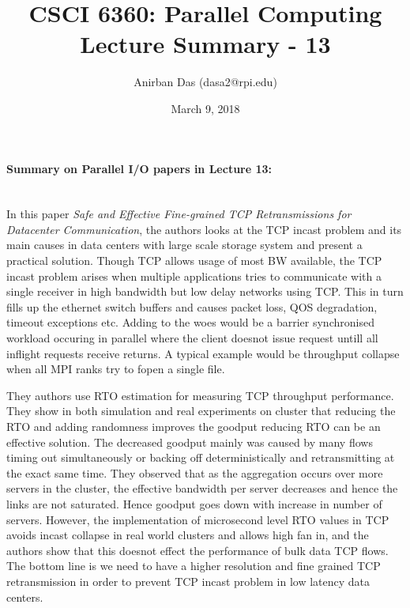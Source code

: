 \documentclass[a4paper,12 pt]{article}
\title{\vspace{-2.0cm}CSCI 6360: Parallel Computing Lecture Summary - 13}
\author{Anirban Das (dasa2@rpi.edu) }
\date{March 9, 2018}
\begin{document}
\maketitle

\paragraph{Summary on Parallel I/O papers in Lecture 13:\\\\}

In this paper \textit{Safe and Effective Fine-grained TCP Retransmissions for Datacenter Communication}, the authors looks at the TCP incast problem and its main causes in data centers with large scale storage system and present a practical solution. Though TCP allows usage of most BW available, the TCP incast problem arises when multiple applications tries to communicate with a single receiver in high bandwidth but low delay networks using TCP. This in turn fills up the ethernet switch buffers and causes packet loss, QOS degradation, timeout exceptions etc. Adding to the woes would be a barrier synchronised workload occuring in parallel where the client doesnot issue request untill all inflight requests receive returns. A typical example would be throughput collapse when all MPI ranks try to fopen a single file.

They authors use RTO estimation for measuring TCP throughput performance. They show in both simulation and real experiments on cluster that reducing the RTO and adding randomness improves the goodput reducing RTO can be an effective solution. The decreased goodput mainly was caused by many flows timing out simultaneously or backing off deterministically and retransmitting at the exact same time. They observed that as the aggregation occurs over more servers in the cluster, the effective bandwidth per server decreases and hence the links are not saturated. Hence goodput goes down with increase in number of servers. However, the implementation of microsecond level RTO values in TCP avoids incast collapse in real world clusters and allows high fan in, and the authors show that this doesnot effect the performance of bulk data TCP flows. The bottom line is we need to have a higher resolution and fine grained TCP retransmission in order to prevent TCP incast problem in low latency data centers. 
\end{document}
